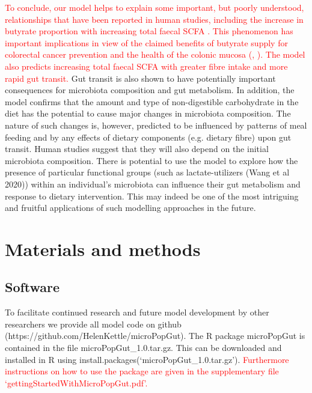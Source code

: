 \documentclass[a4paper]{article}
\begin{document}
\textcolor{red}{To conclude, our model helps to explain some important, but poorly understood, relationships that have been reported in human studies, including the increase in butyrate proportion with increasing total faecal SCFA \citep{labouyer}. This phenomenon has important implications in view of the claimed benefits of butyrate supply for colorectal cancer prevention and the health of the colonic mucosa (\cite{louis2014}, \cite{hamer2008}). 
The model also predicts increasing total faecal SCFA with greater fibre intake and more rapid gut transit.
}
Gut transit is also shown to have potentially important consequences for microbiota composition and gut metabolism. In addition, the model confirms that the amount and type of non-digestible carbohydrate in the diet has the potential to cause major changes in microbiota composition. 
The nature of such changes is, however, predicted to be influenced by patterns of meal feeding and by any effects of dietary components (e.g. dietary fibre) upon gut transit. 
Human studies suggest that they will also depend on the initial microbiota composition. 
There is potential to use the model to explore how the presence of particular functional groups (such as lactate-utilizers (Wang et al 2020)) within an individual's microbiota can influence their gut metabolism and response to dietary intervention. This may indeed be one of the most intriguing and fruitful applications of such modelling approaches in the future.

\section*{Materials and methods}

\subsection*{Software}
To facilitate continued research and future model development by other researchers we provide all model code on github (https://github.com/HelenKettle/microPopGut). The R package microPopGut is contained in the file microPopGut\_1.0.tar.gz. This can be downloaded and installed in R using install.packages(`microPopGut\_1.0.tar.gz'). \textcolor{red}{Furthermore instructions on how to use the package are given in the supplementary file `gettingStartedWithMicroPopGut.pdf'.}
\end{document}
